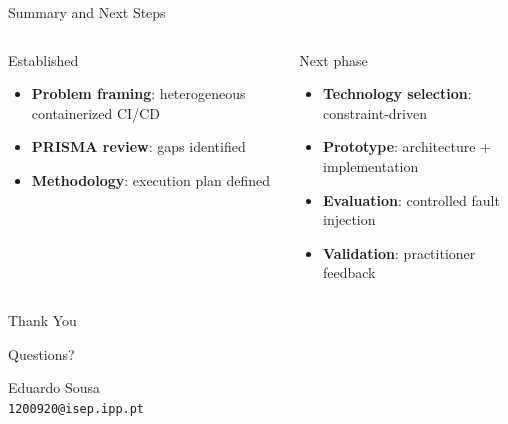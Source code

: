 \documentclass[aspectratio=169]{beamer}
\begin{document}
\begin{frame}{Summary and Next Steps}
\begin{columns}[T,onlytextwidth]
  \begin{block}{Established}
  \begin{itemize}
    \item \textbf{Problem framing}: heterogeneous containerized CI/CD
    \item \textbf{PRISMA review}: gaps identified
    \item \textbf{Methodology}: execution plan defined
  \end{itemize}
  \end{block}

  \begin{block}{Next phase}
  \begin{itemize}
    \item \textbf{Technology selection}: constraint-driven
    \item \textbf{Prototype}: architecture + implementation
    \item \textbf{Evaluation}: controlled fault injection
    \item \textbf{Validation}: practitioner feedback
  \end{itemize}
  \end{block}
\end{columns}
\end{frame}

\begin{frame}[plain]
\centering
\vfill
{\Huge Thank You}

\vspace{1.5em}

{\Large Questions?}

\vfill

\begin{center}
\small
Eduardo Sousa\\
\texttt{1200920@isep.ipp.pt}
\end{center}
\end{frame}
\end{document}
